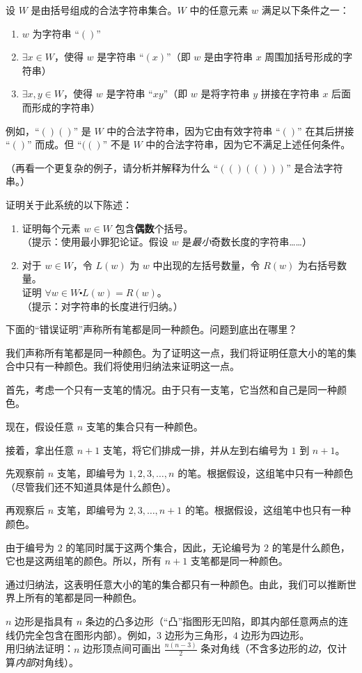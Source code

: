 \begin{exercise}
    设 $W$ 是由括号组成的合法字符串集合。$W$ 中的任意元素 $w$ 满足以下条件之一：
    \begin{enumerate}[i]
        \item $w$ 为字符串 ``$()$''
        \item $\exists x \in W$，使得 $w$ 是字符串 ``$(x)$''（即 $w$ 是由字符串 $x$ 周围加括号形成的字符串）
        \item $\exists x, y \in W$，使得 $w$ 是字符串 ``$xy$''（即 $w$ 是将字符串 $y$ 拼接在字符串 $x$ 后面而形成的字符串）
    \end{enumerate}
    例如，``$()()$'' 是 $W$ 中的合法字符串，因为它由有效字符串 ``$()$'' 在其后拼接 ``$()$'' 而成。但 ``$(( )$'' 不是 $W$ 中的合法字符串，因为它不满足上述任何条件。

    （再看一个更复杂的例子，请分析并解释为什么 ``$(()(()))$'' 是合法字符串。）

    证明关于此系统的以下陈述：
    \begin{enumerate}[label=(\alph*)]
        \item 证明每个元素 $w \in W$ 包含\textbf{偶数}个括号。\\
        （提示：使用最小罪犯论证。假设 $w$ 是\emph{最小}奇数长度的字符串……）
        \item 对于 $w \in W$，令 $L(w)$ 为 $w$ 中出现的左括号数量，令 $R(w)$ 为右括号数量。\\
        证明 $\forall w \in W \centerdot L(w) = R(w)$。\\
        （提示：对字符串的长度进行归纳。）
    \end{enumerate}
\end{exercise}

\begin{exercise}
    下面的``错误证明''声称所有笔都是同一种颜色。问题到底出在哪里？

    \begin{spoof}
        我们声称所有笔都是同一种颜色。为了证明这一点，我们将证明任意大小的笔的集合中只有一种颜色。我们将使用归纳法来证明这一点。

        首先，考虑一个只有一支笔的情况。由于只有一支笔，它当然和自己是同一种颜色。

        现在，假设任意 $n$ 支笔的集合只有一种颜色。

        接着，拿出任意 $n+1$ 支笔，将它们排成一排，并从左到右编号为 $1$ 到 $n + 1$。

        先观察前 $n$ 支笔，即编号为 $1,2,3, \dots ,n$ 的笔。根据假设，这组笔中只有一种颜色（尽管我们还不知道具体是什么颜色）。

        再观察后 $n$ 支笔，即编号为 $2,3, \dots ,n+1$ 的笔。根据假设，这组笔中也只有一种颜色。

        由于编号为 $2$ 的笔同时属于这两个集合，因此，无论编号为 $2$ 的笔是什么颜色，它也是这两组笔的颜色。所以，所有 $n + 1$ 支笔都是同一种颜色。

        通过归纳法，这表明任意大小的笔的集合都只有一种颜色。由此，我们可以推断世界上所有的笔都是同一种颜色。
    \end{spoof}
\end{exercise}

\begin{exercise}
    $n$ 边形是指具有 $n$ 条边的凸多边形（``凸''指图形无凹陷，即其内部任意两点的连线仍完全包含在图形内部）。例如，$3$ 边形为三角形，$4$ 边形为四边形。\\
    用归纳法证明：$n$ 边形顶点间可画出 $\frac{n(n-3)}{2}$ 条对角线（不含多边形的\emph{边}，仅计算\emph{内部}对角线）。
\end{exercise}
